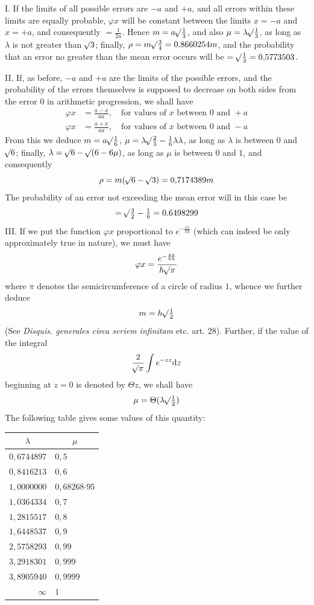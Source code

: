 I. If the limits of all possible errors are \(-a\) and \(+a\), and all errors within these limits are equally probable, \(\varphi x\) will be constant between the limits \(x=-a\) and \(x=+a\), and consequently \(=\tfrac{1}{2a}\). Hence \(m=a\mathord{{}^{}\!\surd}\tfrac13\), and also \(\mu=\lambda\mathord{{}^{}\!\surd}\tfrac13\), as long as \(\lambda\) is not greater than \(\mathord{{}^{}\!\surd}3\); finally, \(\rho=m\mathord{{}^{}\!\surd}\tfrac34=0{,}8660254m\), and the probability that an error no greater than the mean error occurs will be \(=\mathord{{}^{}\!\surd}\tfrac13=0{,}5773503\).

II. If, as before, \(-a\) and \(+a\) are the limits of the possible errors, and the probability of the errors themselves is supposed to decrease on both sides from the error \(0\) in arithmetic progression, we shall have
\[
\begin{aligned}
\varphi x&=\frac{a-x}{aa},\quad\text{for values of }x\text{ between }0\text{ and }+a\\[3pt]
\varphi x&=\frac{a+x}{aa},\quad\text{for values of }x\text{ between }0\text{ and }-a
\end{aligned}
\]
From this we deduce \(m=a\mathord{{}^{}\!\surd}\tfrac16\), \(\mu=\lambda\mathord{{}^{}\!\surd}\tfrac23-\tfrac16\lambda\lambda\), as long as \(\lambda\) is between \(0\) and \(\mathord{{}^{}\!\surd}6\); finally, \(\lambda=\mathord{{}^{}\!\surd}6-\mathord{{}^{}\!\surd}(6-6\mu)\), as long as \(\mu\) is between \(0\) and \(1\), and consequently
\[
\rho=m(\mathord{{}^{}\!\surd}6-\mathord{{}^{}\!\surd}3)=0{,}7174389m
\]
The probability of an error not exceeding the mean error will in this case be
\[
=\mathord{{}^{}\!\surd}\tfrac32-\tfrac16=0{,}6498299
\]
III. If we put the function \(\varphi x\) proportional to \(e^{-\frac{xx}{hh}}\) (which can indeed be only approximately true in nature), we must have
\[
\varphi x=\frac{e^{-\frac{xx}{hh}}}{h\mathord{{}^{}\!\surd}\pi}
\]
where \(\pi\) denotes the semicircumference of a circle of radius \(1\), whence we further deduce
\[
m=h\mathord{{}^{}\!\surd}\tfrac12
\]
(See \textit{Disquis. generales circa seriem infinitam} etc. art. 28). Further, if the value of the integral
\[
\frac{2}{\mathord{{}^{}\!\surd}\pi}\int e^{-zz}\mathrm{d}z
\]
beginning at \(z=0\) is denoted by \(\Theta z\), we shall have
\[
\mu=\Theta(\lambda\mathord{{}^{}\!\surd}\tfrac12)
\]
The following table gives some values of this quantity:
\begin{center}
\begin{tabular}{r|l}
\multicolumn{1}{c|}{\(\lambda\)}&\multicolumn{1}{c}{\(\mu\)}\\\hline
\(0{,}6744897\)&\(0{,}5\)\\
\(0{,}8416213\)&\(0{,}6\)\\
\(1{,}0000000\)&\(0{,}68268\mathord{\cdot}95\)\\
\(1{,}0364334\)&\(0{,}7\)\\
\(1{,}2815517\)&\(0{,}8\)\\
\(1{,}6448537\)&\(0{,}9\)\\
\(2{,}5758293\)&\(0{,}99\)\\
\(3{,}2918301\)&\(0{,}999\)\\
\(3{,}8905940\)&\(0{,}9999\)\\
\(\infty\)&\(1\)
\end{tabular}
\end{center}

\clearpage
